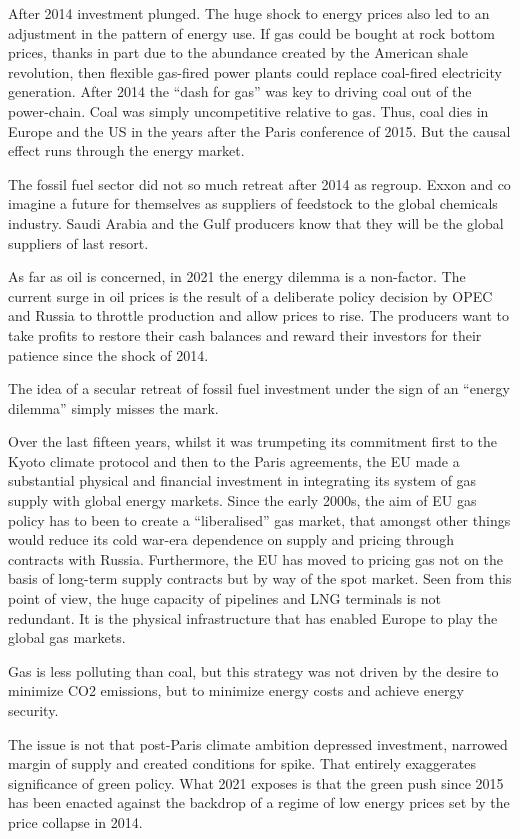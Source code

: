\documentclass[
]{book}
\begin{document}
After 2014 investment plunged.
The huge shock to energy prices also led to an adjustment in the pattern of energy use. If gas could be bought at rock bottom prices, thanks in part due to the abundance created by the American shale revolution, then flexible gas-fired power plants could replace coal-fired electricity generation. After 2014 the ``dash for gas'' was key to driving coal out of the power-chain.
Coal was simply uncompetitive relative to gas. Thus, coal dies in Europe and the US in the years after the Paris conference of 2015. But the causal effect runs through the energy market.

The fossil fuel sector did not so much retreat after 2014 as regroup.
Exxon and co imagine a future for themselves as suppliers of feedstock to the global chemicals industry.
Saudi Arabia and the Gulf producers know that they will be the global suppliers of last resort.

As far as oil is concerned, in 2021 the energy dilemma is a non-factor. The current surge in oil prices is the result of a deliberate policy decision by OPEC and Russia to throttle production and allow prices to rise. The producers want to take profits to restore their cash balances and reward their investors for their patience since the shock of 2014.

The idea of a secular retreat of fossil fuel investment under the sign of an ``energy dilemma'' simply misses the mark.

Over the last fifteen years, whilst it was trumpeting its commitment first to the Kyoto climate protocol and then to the Paris agreements, the EU made a substantial physical and financial investment in integrating its system of gas supply with global energy markets. Since the early 2000s, the aim of EU gas policy has to been to create a ``liberalised'' gas market, that amongst other things would reduce its cold war-era dependence on supply and pricing through contracts with Russia. Furthermore, the EU has moved to pricing gas not on the basis of long-term supply contracts but by way of the spot market. Seen from this point of view, the huge capacity of pipelines and LNG terminals is not redundant. It is the physical infrastructure that has enabled Europe to play the global gas markets.

Gas is less polluting than coal, but this strategy was not driven by the desire to minimize CO2 emissions, but to minimize energy costs and achieve energy security.

The issue is not that post-Paris climate ambition depressed investment, narrowed margin of supply and created conditions for spike. That entirely exaggerates significance of green policy. What 2021 exposes is that the green push since 2015 has been enacted against the backdrop of a regime of low energy prices set by the price collapse in 2014.
\end{document}

